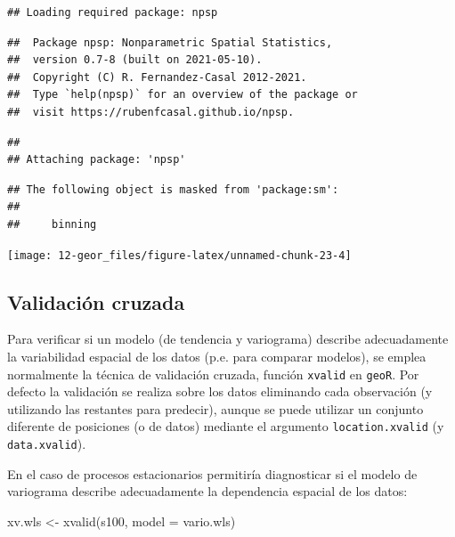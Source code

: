 \documentclass[
  spanish,
]{book}
\newenvironment{Shaded}{\begin{snugshade}}{\end{snugshade}}
\newcommand{\AttributeTok}[1]{\textcolor[rgb]{0.77,0.63,0.00}{#1}}
\newcommand{\FunctionTok}[1]{\textcolor[rgb]{0.00,0.00,0.00}{#1}}
\newcommand{\NormalTok}[1]{#1}
\newcommand{\OtherTok}[1]{\textcolor[rgb]{0.56,0.35,0.01}{#1}}
\theoremstyle{break}
\begin{document}
\begin{verbatim}
## Loading required package: npsp
\end{verbatim}

\begin{verbatim}
##  Package npsp: Nonparametric Spatial Statistics,
##  version 0.7-8 (built on 2021-05-10).
##  Copyright (C) R. Fernandez-Casal 2012-2021.
##  Type `help(npsp)` for an overview of the package or
##  visit https://rubenfcasal.github.io/npsp.
\end{verbatim}

\begin{verbatim}
## 
## Attaching package: 'npsp'
\end{verbatim}

\begin{verbatim}
## The following object is masked from 'package:sm':
## 
##     binning
\end{verbatim}

\begin{center}\texttt{[image: 12-geor\_files/figure-latex/unnamed-chunk-23-4]} \end{center}

\hypertarget{validaciuxf3n-cruzada}{%
\subsection{Validación cruzada}\label{validaciuxf3n-cruzada}}

Para verificar si un modelo (de tendencia y variograma) describe adecuadamente
la variabilidad espacial de los datos (p.e. para comparar modelos), se emplea
normalmente la técnica de validación cruzada, función \texttt{xvalid} en \texttt{geoR}.
Por defecto la validación se realiza sobre los datos eliminando cada
observación (y utilizando las restantes para predecir), aunque se puede
utilizar un conjunto diferente de posiciones (o de datos) mediante el
argumento \texttt{location.xvalid} (y \texttt{data.xvalid}).

En el caso de procesos estacionarios permitiría diagnosticar si el modelo de
variograma describe adecuadamente la dependencia espacial de los datos:

\begin{Shaded}
\begin{Highlighting}[]
\NormalTok{xv.wls }\OtherTok{\textless{}{-}} \FunctionTok{xvalid}\NormalTok{(s100, }\AttributeTok{model =}\NormalTok{ vario.wls)}
\end{Highlighting}
\end{Shaded}
\end{document}
